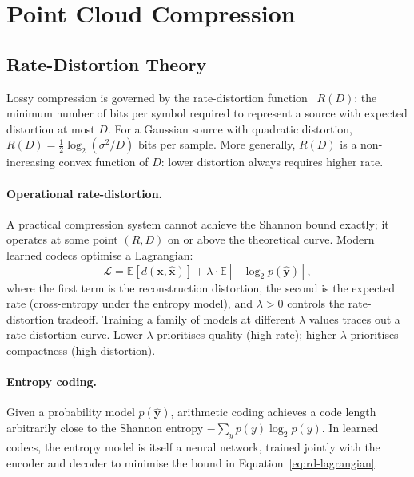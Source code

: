 \section{Point Cloud Compression}
\label{sec:compression}

\subsection{Rate-Distortion Theory}
\label{ssec:rate-distortion}

Lossy compression is governed by the rate-distortion
function~\cite{shannon1959coding} $R(D)$: the minimum number of bits per
symbol required to represent a source with expected distortion at most $D$.
For a Gaussian source with quadratic distortion,
$R(D) = \frac{1}{2}\log_2(\sigma^2/D)$ bits per sample.
More generally, $R(D)$ is a non-increasing convex function of $D$:
lower distortion always requires higher rate.

\paragraph{Operational rate-distortion.}
A practical compression system cannot achieve the Shannon bound exactly;
it operates at some point $(R, D)$ on or above the theoretical curve.
Modern learned codecs optimise a Lagrangian:
\begin{equation}
  \mathcal{L} = \mathbb{E}\left[d(\mathbf{x}, \hat{\mathbf{x}})\right]
              + \lambda \cdot \mathbb{E}\left[-\log_2 p(\hat{\mathbf{y}})\right],
  \label{eq:rd-lagrangian}
\end{equation}
where the first term is the reconstruction distortion, the second is the
expected rate (cross-entropy under the entropy model), and $\lambda > 0$
controls the rate-distortion tradeoff.
Training a family of models at different $\lambda$ values traces out a
rate-distortion curve.
Lower $\lambda$ prioritises quality (high rate); higher $\lambda$ prioritises
compactness (high distortion).

\paragraph{Entropy coding.}
Given a probability model $p(\hat{\mathbf{y}})$, arithmetic coding achieves
a code length arbitrarily close to the Shannon entropy $-\sum_y p(y)\log_2 p(y)$.
In learned codecs, the entropy model is itself a neural network, trained
jointly with the encoder and decoder to minimise the bound in
Equation~\ref{eq:rd-lagrangian}.

